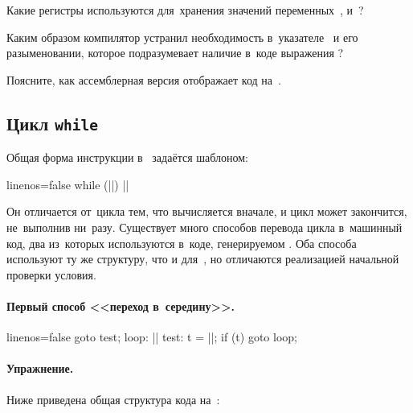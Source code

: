 \begin{enumIssue}
  \item Какие регистры используются для~хранения значений переменных~,  и~?
  \item Каким образом компилятор устранил необходимость в~указателе~ и его разыменовании, которое подразумевает наличие в~коде выражения ?
  \item Поясните, как ассемблерная версия отображает код на~.
\end{enumIssue}



\subsection{Цикл \texttt{while}}
Общая форма инструкции  в~ задаётся шаблоном:

\begin{ccode*}{linenos=false}
while (||)
  ||
\end{ccode*}

\noindent Он отличается от~цикла  тем, что  вычисляется вначале, и цикл может закончится, не~выполнив  ни~разу. Существует много способов перевода цикла  в~машинный код, два из~которых используются в~коде, генерируемом \GCC. Оба способа используют ту же структуру, что и для~, но отличаются реализацией начальной проверки условия.


\paragraph{Первый способ <<переход в~середину>>.}
\enlargethispage{\baselineskip}
\begin{ccode*}{linenos=false}
  goto test;
loop:
  ||
test:
  t = ||;
  if (t)
    goto loop;
\end{ccode*}


\paragraph{Упражнение.}
Ниже приведена общая структура кода на~:

